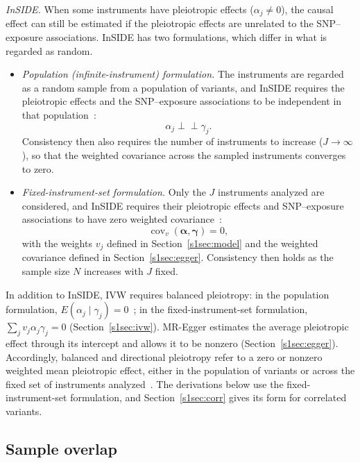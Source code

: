 \noindent \textit{InSIDE.} When some instruments have pleiotropic effects ($\alpha_j\neq0$), the causal effect can still be estimated if the pleiotropic effects are unrelated to the SNP--exposure associations. InSIDE has two formulations, which differ in what is regarded as random.
\begin{itemize}
\item \textit{Population (infinite-instrument) formulation.} The instruments are regarded as a random sample from a population of variants, and InSIDE requires the pleiotropic effects and the SNP--exposure associations to be independent in that population~\cite{bowden2015egger}:
\begin{equation*}
\alpha_j\perp\!\!\!\perp\gamma_j .
\end{equation*}
Consistency then also requires the number of instruments to increase ($J\to\infty$), so that the weighted covariance across the sampled instruments converges to zero.
\item \textit{Fixed-instrument-set formulation.} Only the $J$ instruments analyzed are considered, and InSIDE requires their pleiotropic effects and SNP--exposure associations to have zero weighted covariance~\cite{burgess2017interpreting}:
\begin{equation*}
\operatorname{cov}_v(\boldsymbol{\alpha},\boldsymbol{\gamma})=0,
\end{equation*}
with the weights $v_j$ defined in Section~\ref{s1sec:model} and the weighted covariance defined in Section~\ref{s1sec:egger}. Consistency then holds as the sample size $N$ increases with $J$ fixed.
\end{itemize}
In addition to InSIDE, IVW requires balanced pleiotropy: in the population formulation, $E(\alpha_j\mid\gamma_j)=0$~\cite{dudbridge2025grip}; in the fixed-instrument-set formulation, $\sum_j v_j\alpha_j\gamma_j=0$ (Section~\ref{s1sec:ivw}). MR-Egger estimates the average pleiotropic effect through its intercept and allows it to be nonzero (Section~\ref{s1sec:egger}). Accordingly, balanced and directional pleiotropy refer to a zero or nonzero weighted mean pleiotropic effect, either in the population of variants or across the fixed set of instruments analyzed~\cite{burgess2017interpreting}. The derivations below use the fixed-instrument-set formulation, and Section~\ref{s1sec:corr} gives its form for correlated variants.

\subsection*{Sample overlap}
\label{s1sec:overlap}

